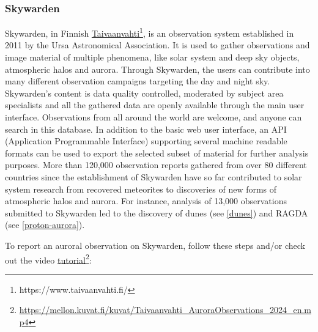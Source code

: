 \documentclass{article}
\newcommand{\contributed}[1]{%
    \par\noindent
    \begingroup
    \setlength{\leftskip}{1em}%
    \itshape
    Contributors: #1
    \par
    \endgroup
    \vspace{0.5em}
}
\begin{document}
\subsubsection{Skywarden}\label{skywarden}
Skywarden, in Finnish \href{https://www.taivaanvahti.fi/}{Taivaanvahti}\footnote{https://www.taivaanvahti.fi/}, is an observation system established in 2011 by the Ursa Astronomical Association. It is used to gather observations and image material of multiple phenomena, like solar system and deep sky objects, atmospheric halos and aurora. Through Skywarden, the users can contribute into many different observation campaigns targeting the day and night sky. Skywarden's content is data quality controlled, moderated by subject area specialists and all the gathered data are openly available through the main user interface. Observations from all around the world are welcome, and anyone can search in this database. In addition to the basic web user interface, an API (Application Programmable Interface) supporting several machine readable formats can be used to export the selected subset of material for further analysis purposes. More than 120,000 observation reports gathered from over 80 different countries since the establishment of Skywarden have so far contributed to solar system research from recovered meteorites to discoveries of new forms of atmospheric halos and aurora. For instance, analysis of 13,000 observations submitted to Skywarden led to the discovery of dunes (see \ref{dunes}) and RAGDA (see \ref{proton-aurora}). 

To report an auroral observation on Skywarden, follow these steps and/or check out the video
\href{https://mellon.kuvat.fi/kuvat/Taivaanvahti_AuroraObservations_2024_en.mp4}{tutorial}\footnote{\url{https://mellon.kuvat.fi/kuvat/Taivaanvahti_AuroraObservations_2024_en.mp4}}:
\end{document}
